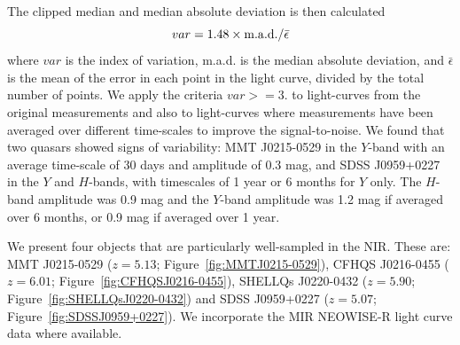 \documentclass[usenatbib]{mnras}
\begin{document}
The clipped median and median absolute deviation is then calculated
\begin{equation}
      var = 1.48 \times  {\rm m.a.d.} / \bar{\epsilon}
\end{equation}
where $var$ is the index of variation, m.a.d. is the median absolute
deviation, and $\bar{\epsilon}$ is the mean of the error in each point
in the light curve, divided by the total number of points. We apply the criteria 
$var>=3.$ to light-curves from the original measurements and also to light-curves 
where measurements have been averaged over different time-scales to improve 
the signal-to-noise. We found that two quasars showed signs of variability:
MMT J0215-0529 in the $Y$-band with an average time-scale of 30 days and amplitude of 0.3 mag, and 
SDSS J0959+0227 in the $Y$ and $H$-bands, with timescales of 1 year or 6 months 
for $Y$ only. The $H$-band amplitude was 0.9 mag and the $Y$-band amplitude was 1.2 mag if averaged over 6 months,
or 0.9 mag if averaged over 1 year.

We present four objects that are particularly well-sampled in the NIR. 
These are: 
MMT J0215-0529       ($z=5.13$; Figure~\ref{fig:MMTJ0215-0529}), 
CFHQS J0216-0455    ($z=6.01$; Figure~\ref{fig:CFHQSJ0216-0455}), 
SHELLQs J0220-0432 ($z=5.90$; Figure~\ref{fig:SHELLQsJ0220-0432}) 
and 
SDSS J0959+0227 ($z=5.07$; Figure~\ref{fig:SDSSJ0959+0227}). 
We incorporate the MIR NEOWISE-R light curve data where available. 
\end{document}
